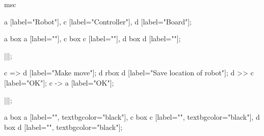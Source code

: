 \begin{msc}
msc
{

a [label="Robot"],
c [label="Controller"],
d [label="Board"];

a box a [label=""],
c box c [label=""],
d box d [label=""];

|||;

c => d [label="Make move"];
d rbox d [label="Save location of robot"];
d >> c [label="OK"];
c -> a [label="OK"];

|||;

a box a [label="", textbgcolor="black"],
c box c [label="", textbgcolor="black"],
d box d [label="", textbgcolor="black"];

}
\end{msc}
